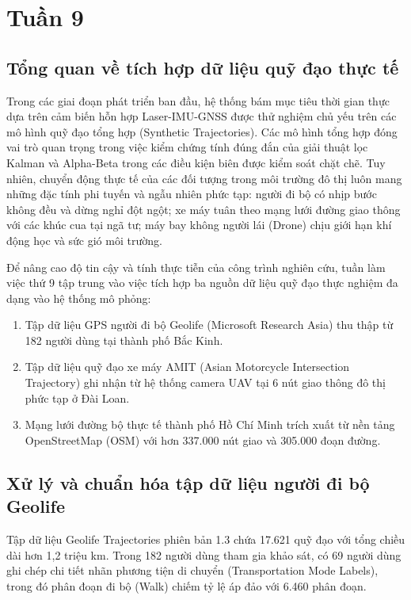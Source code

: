 \section{Tuần 9}

\subsection{Tổng quan về tích hợp dữ liệu quỹ đạo thực tế}

\hspace{0.5cm} Trong các giai đoạn phát triển ban đầu, hệ thống bám mục tiêu thời gian thực dựa trên cảm biến hỗn hợp Laser-IMU-GNSS được thử nghiệm chủ yếu trên các mô hình quỹ đạo tổng hợp (Synthetic Trajectories). Các mô hình tổng hợp đóng vai trò quan trọng trong việc kiểm chứng tính đúng đắn của giải thuật lọc Kalman và Alpha-Beta trong các điều kiện biên được kiểm soát chặt chẽ. Tuy nhiên, chuyển động thực tế của các đối tượng trong môi trường đô thị luôn mang những đặc tính phi tuyến và ngẫu nhiên phức tạp: người đi bộ có nhịp bước không đều và dừng nghỉ đột ngột; xe máy tuân theo mạng lưới đường giao thông với các khúc cua tại ngã tư; máy bay không người lái (Drone) chịu giới hạn khí động học và sức gió môi trường.

Để nâng cao độ tin cậy và tính thực tiễn của công trình nghiên cứu, tuần làm việc thứ 9 tập trung vào việc tích hợp ba nguồn dữ liệu quỹ đạo thực nghiệm đa dạng vào hệ thống mô phỏng:
\begin{enumerate}
    \item Tập dữ liệu GPS người đi bộ Geolife (Microsoft Research Asia) thu thập từ 182 người dùng tại thành phố Bắc Kinh.
    \item Tập dữ liệu quỹ đạo xe máy AMIT (Asian Motorcycle Intersection Trajectory) ghi nhận từ hệ thống camera UAV tại 6 nút giao thông đô thị phức tạp ở Đài Loan.
    \item Mạng lưới đường bộ thực tế thành phố Hồ Chí Minh trích xuất từ nền tảng OpenStreetMap (OSM) với hơn 337.000 nút giao và 305.000 đoạn đường.
\end{enumerate}

\subsection{Xử lý và chuẩn hóa tập dữ liệu người đi bộ Geolife}

\hspace{0.5cm} Tập dữ liệu Geolife Trajectories phiên bản 1.3 chứa 17.621 quỹ đạo với tổng chiều dài hơn 1,2 triệu km. Trong 182 người dùng tham gia khảo sát, có 69 người dùng ghi chép chi tiết nhãn phương tiện di chuyển (Transportation Mode Labels), trong đó phân đoạn đi bộ (Walk) chiếm tỷ lệ áp đảo với 6.460 phân đoạn.

